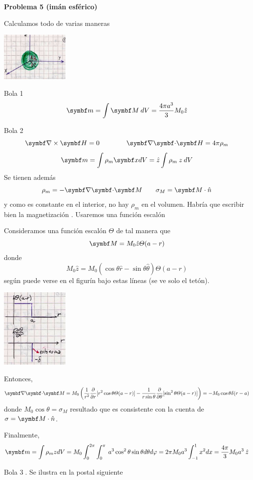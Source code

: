 \documentclass[10pt,oneside]{CBFT_book}
\begin{document}
\begin{ejemplo}{\bf Problema 5 (imán esférico)}

Calculamos todo de varias maneras

\includegraphics[width=0.25\textwidth]{images/fig_ft1_imanesferico_A.jpg}

Bola \textcircled{1}
\[
	\vb{m} = \int \vb{M} \: dV = \frac{4 \pi a^3 }{3} M_0 \hat{z}
\]

Bola \textcircled{2}
\[
	\rotorm{H} = 0 \qquad \qquad \divem{H} = 4 \pi \rho_m
\]
\[
	\vb{m} = \int \rho_m \vbx dV = \hat{z} \int \rho_m \: z \: dV
\]
Se tienen además
\[
	\rho_m = - \divem{M} \qquad \sigma_M = \vb{M}\cdot{\hat{n}}
\]
y como  es constante en el interior, no hay $\rho_m$ en el volumen.
Habría que escribir bien la magnetización .
Usaremos una función escalón

Consideramos una función escalón $ \Theta $ de tal manera que 
\[
	\vb{M} = M_0 \hat{z} \Theta(a-r)
\]
donde 
\[
	M_0 \hat{z} = M_0 ( \cos\theta \hat{r} - \sin\theta \hat{\theta} ) \Theta(a-r)
\]
según puede verse en el figurín bajo estas líneas (se ve solo el tetón).

\includegraphics[width=0.25\textwidth]{images/fig_ft1_imanesferico_B.jpg}

Entonces,
\[
	\divem{M} = M_0 \left( 
	 \frac{1}{r^2}\dpar{}{r}[ r^2 \cos\theta \Theta(a-r) ] -
	 \frac{1}{r\sin\theta}\dpar{}{\theta}[ \sin^2\theta \Theta(a-r) ]
	\right) = - M_0 \cos\theta \delta(r-a)
\]
donde $ M_0 \cos\theta = \sigma_M $ resultado que es consistente con la cuenta de
$\sigma = \vb{M}\cdot\hat{n}$.

Finalmente,
\[
	\vb{m} = \int \rho_m z dV = M_0 \int_0^{2\pi} \int_0^\pi \: a^3\cos^2\theta \sin\theta d\theta d\vp
	= 2 \pi M_0 a^3 \int_{-1}^1 x^2 dx = \frac{4\pi}{3} M_0 a^3 \zver
\]

Bola \textcircled{3}. Se ilustra en la postal siguiente


\end{ejemplo}
\end{document}
